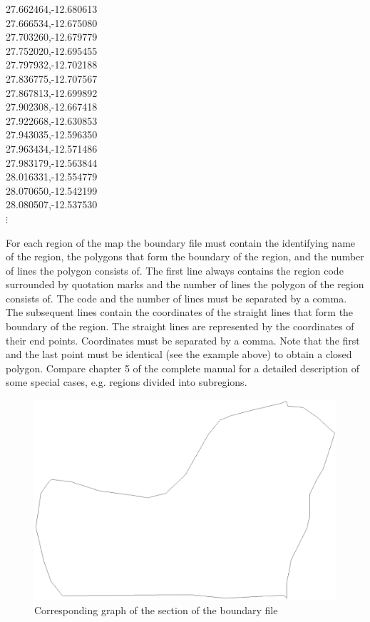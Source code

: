 \documentclass{article}
\begin{document}
 27.662464,-12.680613\\
 27.666534,-12.675080\\
 27.703260,-12.679779\\
 27.752020,-12.695455\\
 27.797932,-12.702188\\
 27.836775,-12.707567\\
 27.867813,-12.699892\\
 27.902308,-12.667418\\
 27.922668,-12.630853\\
 27.943035,-12.596350\\
 27.963434,-12.571486\\
 27.983179,-12.563844\\
 28.016331,-12.554779\\
 28.070650,-12.542199\\
 28.080507,-12.537530\\

\hspace{1cm} $\vdots$

\normalsize

\vspace{0.3cm}

For each region of the map the boundary file must contain the
identifying name of the region, the polygons that form the
boundary of the region, and the number of lines the polygon
consists of. The first line always contains the region code
surrounded by quotation marks and the number of lines the polygon
of the region consists of. The code and the number of lines must
be separated by a comma. The subsequent lines contain the
coordinates of the straight lines that form the boundary of the
region. The straight lines are represented by the coordinates of
their end points. Coordinates must be separated by a comma. Note
that the first and the last point must be identical (see the
example above) to obtain a closed polygon. Compare chapter 5 of
the complete manual for a detailed description of some special
cases, e.g. regions divided into subregions.

\begin{figure}[h]
\centering
\includegraphics [scale=0.3]{grafiken/zambia52.ps}
\caption{\label{zambia52} Corresponding graph of the section of
the boundary file}
\end{figure}
\end{document}
